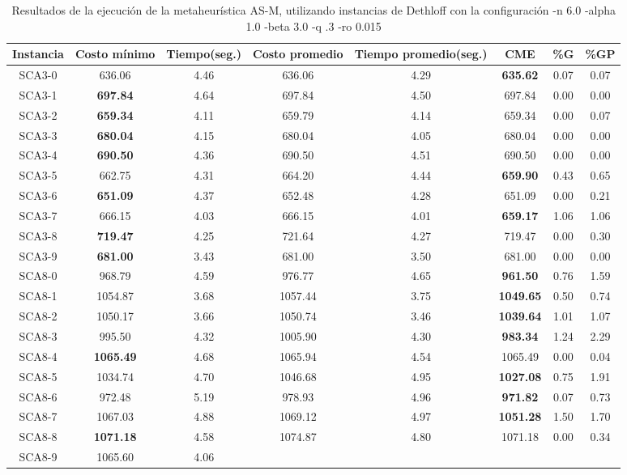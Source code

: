 \begin{table}[h]
\caption{Resultados de la ejecución de la metaheurística AS-M, utilizando instancias de Dethloff con la configuración -n 6.0 -alpha 1.0 -beta 3.0 -q .3 -ro 0.015}
\centering
\small
\begin{tabular}{c c c c c c c c}
\hline\hline
Instancia & Costo mínimo & Tiempo(seg.) & Costo promedio & Tiempo promedio(seg.) & CME & \%G & \%GP \\ [0.5ex]
\hline
SCA3-0 & 636.06 & 4.46 & 
636.06 & 4.29 & \bf{635.62} & 
0.07 & 0.07\\SCA3-1 & \bf{697.84} & 4.64 & 
697.84 & 4.50 & 697.84 & 0.00
 & 0.00\\
SCA3-2 & \bf{659.34} & 4.11 & 
659.79 & 4.14 & 659.34 & 0.00
 & 0.07\\SCA3-3 & \bf{680.04} & 4.15 & 
680.04 & 4.05 & 680.04 & 0.00
 & 0.00\\
SCA3-4 & \bf{690.50} & 4.36 & 
690.50 & 4.51 & 690.50 & 0.00
 & 0.00\\
SCA3-5 & 662.75 & 4.31 & 
664.20 & 4.44 & \bf{659.90} & 
0.43 & 0.65\\SCA3-6 & \bf{651.09} & 4.37 & 
652.48 & 4.28 & 651.09 & 0.00
 & 0.21\\SCA3-7 & 666.15 & 4.03 & 
666.15 & 4.01 & \bf{659.17} & 
1.06 & 1.06\\SCA3-8 & \bf{719.47} & 4.25 & 
721.64 & 4.27 & 719.47 & 0.00
 & 0.30\\SCA3-9 & \bf{681.00} & 3.43 & 
681.00 & 3.50 & 681.00 & 0.00
 & 0.00\\
SCA8-0 & 968.79 & 4.59 & 
976.77 & 4.65 & \bf{961.50} & 
0.76 & 1.59\\SCA8-1 & 1054.87 & 3.68 & 
1057.44 & 3.75 & \bf{1049.65} & 
0.50 & 0.74\\SCA8-2 & 1050.17 & 3.66 & 
1050.74 & 3.46 & \bf{1039.64} & 
1.01 & 1.07\\SCA8-3 & 995.50 & 4.32 & 
1005.90 & 4.30 & \bf{983.34} & 
1.24 & 2.29\\SCA8-4 & \bf{1065.49} & 4.68 & 
1065.94 & 4.54 & 1065.49 & 0.00
 & 0.04\\SCA8-5 & 1034.74 & 4.70 & 
1046.68 & 4.95 & \bf{1027.08} & 
0.75 & 1.91\\SCA8-6 & 972.48 & 5.19 & 
978.93 & 4.96 & \bf{971.82} & 
0.07 & 0.73\\SCA8-7 & 1067.03 & 4.88 & 
1069.12 & 4.97 & \bf{1051.28} & 
1.50 & 1.70\\SCA8-8 & \bf{1071.18} & 4.58 & 
1074.87 & 4.80 & 1071.18 & 0.00
 & 0.34\\SCA8-9 & 1065.60 & 4.06 & 

\end{tabular}
\end{table}
